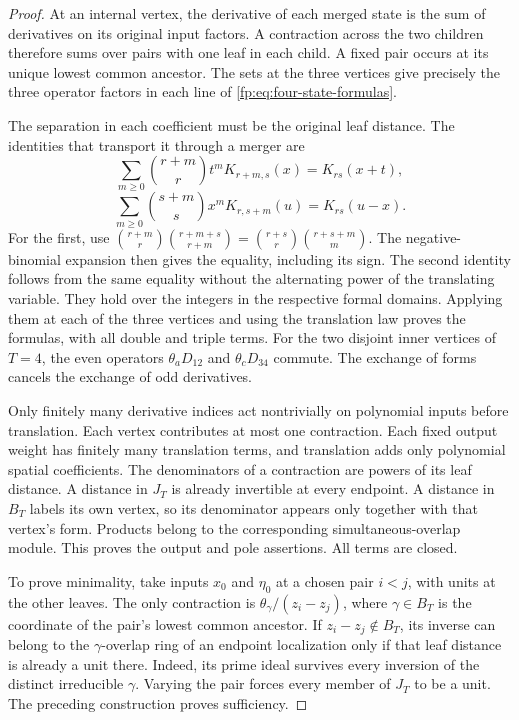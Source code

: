 \begin{proof}
At an internal vertex, the derivative of each merged state is the
sum of derivatives on its original input factors.  A contraction
across the two children therefore sums over pairs with one leaf
in each child.  A fixed pair occurs at its unique lowest common
ancestor.  The sets at the three vertices give precisely the three
operator factors in each line of \eqref{fp:eq:four-state-formulas}.

The separation in each coefficient must be the original leaf distance.
The identities that transport it through a merger are
\[
 \sum_{m\ge0}\binom{r+m}{r}t^mK_{r+m,s}(x)=K_{rs}(x+t),
\]
\[
 \sum_{m\ge0}\binom{s+m}{s}x^mK_{r,s+m}(u)=K_{rs}(u-x).
\]
For the first, use
\(\binom{r+m}{r}\binom{r+m+s}{r+m}
=\binom{r+s}{r}\binom{r+s+m}{m}\).
The negative-binomial expansion then gives the equality, including
its sign.  The second identity follows from the same equality
without the alternating power of the translating variable.
They hold over the integers in the respective formal domains.
Applying them at each of the three vertices and using the translation
law proves the formulas, with all double and triple terms.
For the two disjoint inner vertices of \(T=4\), the even operators
\(\theta_aD_{12}\) and \(\theta_cD_{34}\) commute.
The exchange of forms cancels the exchange of odd derivatives.

Only finitely many derivative indices act nontrivially on polynomial
inputs before translation.  Each vertex contributes at most one
contraction.  Each fixed output weight has finitely many translation
terms, and translation adds only polynomial spatial coefficients.
The denominators of a contraction are powers of its leaf distance.
A distance in \(J_T\) is already invertible at every endpoint.
A distance in \(B_T\) labels its own vertex, so its denominator
appears only together with that vertex's form.  Products belong to
the corresponding simultaneous-overlap module.  This proves the
output and pole assertions.  All terms are closed.

To prove minimality, take inputs \(x_0\) and \(\eta_0\)
at a chosen pair \(i<j\), with units at the other leaves.
The only contraction is
\(\theta_\gamma/(z_i-z_j)\), where \(\gamma\in B_T\)
is the coordinate of the pair's lowest common ancestor.
If \(z_i-z_j\notin B_T\), its inverse can belong to the
\(\gamma\)-overlap ring of an endpoint localization only if
that leaf distance is already a unit there.  Indeed, its prime
ideal survives every inversion of the distinct irreducible
\(\gamma\).  Varying the pair forces every member of \(J_T\)
to be a unit.  The preceding construction proves sufficiency.
\end{proof}

